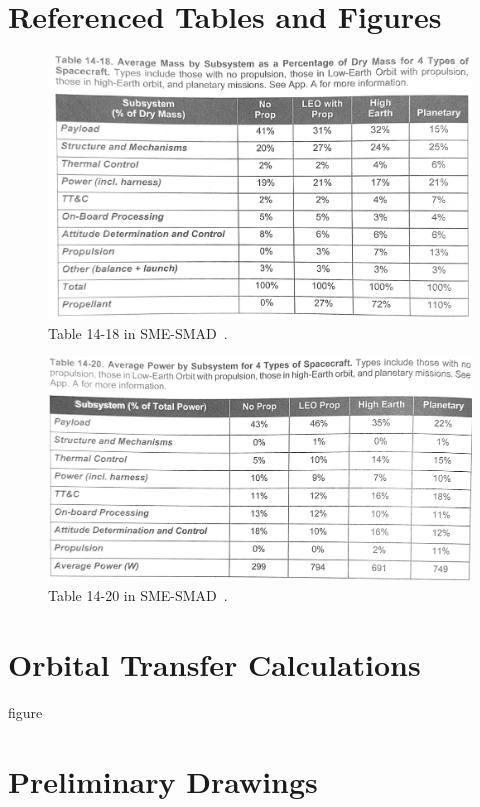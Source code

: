 \documentclass[9pt]{article}
\begin{document}
\section{Referenced Tables and Figures}\label{app:refs}
\begin{figure}[h]
  \centering
  \includegraphics[width=.8\textwidth]{1418}
  \caption{Table 14-18 in SME-SMAD~\cite[p. 422]{sme}.}
  \label{fig:1418}
\end{figure}
\begin{figure}[h]
  \centering
  \includegraphics[width=.8\textwidth]{1420}
  \caption{Table 14-20 in SME-SMAD~\cite[p. 424]{sme}.}
  \label{fig:1420}
\end{figure}


\clearpage
\section{Orbital Transfer Calculations}\label{app:orbcalcs}
figure


\vfill
\section{Preliminary Drawings}\label{app:julia}
\end{document}
